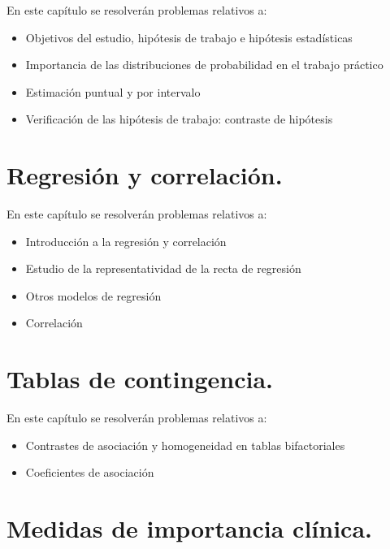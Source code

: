 \documentclass[
]{book}
\providecommand{\tightlist}{%
  \setlength{\itemsep}{0pt}\setlength{\parskip}{0pt}}
\begin{document}
En este capítulo se resolverán problemas relativos a:

\begin{itemize}
\tightlist
\item
  Objetivos del estudio, hipótesis de trabajo e hipótesis estadísticas
\item
  Importancia de las distribuciones de probabilidad en el trabajo práctico
\item
  Estimación puntual y por intervalo
\item
  Verificación de las hipótesis de trabajo: contraste de hipótesis
\end{itemize}

\hypertarget{regresiuxf3n-y-correlaciuxf3n.}{%
\chapter{Regresión y correlación.}\label{regresiuxf3n-y-correlaciuxf3n.}}

En este capítulo se resolverán problemas relativos a:

\begin{itemize}
\tightlist
\item
  Introducción a la regresión y correlación
\item
  Estudio de la representatividad de la recta de regresión
\item
  Otros modelos de regresión
\item
  Correlación
\end{itemize}

\hypertarget{tablas-de-contingencia.}{%
\chapter{Tablas de contingencia.}\label{tablas-de-contingencia.}}

En este capítulo se resolverán problemas relativos a:

\begin{itemize}
\tightlist
\item
  Contrastes de asociación y homogeneidad en tablas bifactoriales
\item
  Coeficientes de asociación
\end{itemize}

\hypertarget{medidas-de-importancia-cluxednica.}{%
\chapter{Medidas de importancia clínica.}\label{medidas-de-importancia-cluxednica.}}
\end{document}
